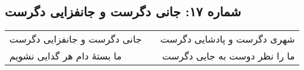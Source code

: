 \begin{center}
\section*{شماره ۱۷: جانی دگرست و جانفزایی دگرست}
\label{sec:017}
\begin{longtable}{l p{0.5cm} r}
جانی دگرست و جانفزایی دگرست
&&
شهری دگرست و پادشایی دگرست
\\
ما بستهٔ دام هر گدایی نشویم
&&
ما را نظر دوست به جایی دگرست
\\
\end{longtable}
\end{center}
